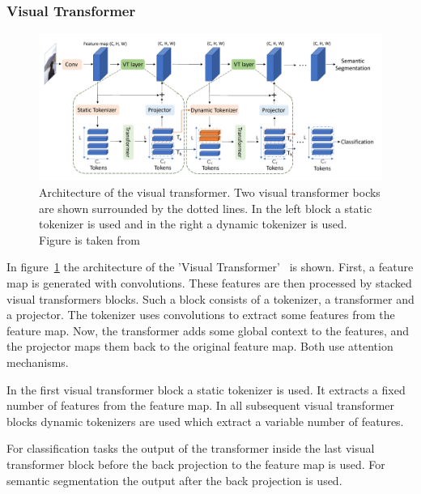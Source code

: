 \documentclass[a4paper]{scrartcl}
\begin{document}
    \subsubsection{Visual Transformer}
    \begin{figure}[btp]
        \centering
        \includegraphics[width=\linewidth]{img/VisualTransformerArchitecture}
        \caption[Architecure Visual Transformer]{
            Architecture of the visual transformer.
            Two visual transformer bocks are shown surrounded by the dotted lines.
            In the left block a static tokenizer is used and in the right a dynamic tokenizer is used.
            Figure is taken from~\cite{wu2020visualV3}}
        \label{fig:visual-transformer-architecture}
    \end{figure}

    In figure~\ref{fig:visual-transformer-architecture} the architecture of the 'Visual Transformer'~\cite{wu2020visualV3} is shown.
    First, a feature map is generated with convolutions.
    These features are then processed by stacked visual transformers blocks.
    Such a block consists of a tokenizer, a transformer and a projector.
    The tokenizer uses convolutions to extract some features from the feature map.
    Now, the transformer adds some global context to the features, and the projector maps them back to the original feature map.
    Both use attention mechanisms.

    In the first visual transformer block a static tokenizer is used.
    It extracts a fixed number of features from the feature map.
    In all subsequent visual transformer blocks dynamic tokenizers are used which extract a variable number of features.

    For classification tasks the output of the transformer inside the last visual transformer block before the back projection to the feature map is used.
    For semantic segmentation the output after the back projection is used.
\end{document}
